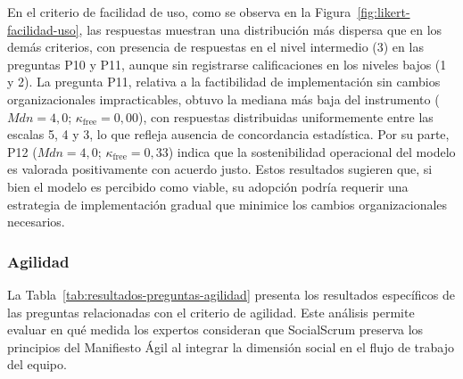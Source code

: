 \endgroup

En el criterio de facilidad de uso, como se observa en la Figura~\ref{fig:likert-facilidad-uso}, las respuestas muestran una distribución más dispersa que en los demás criterios, con presencia de respuestas en el nivel intermedio (3) en las preguntas P10 y P11, aunque sin registrarse calificaciones en los niveles bajos (1 y 2). La pregunta P11, relativa a la factibilidad de implementación sin cambios organizacionales impracticables, obtuvo la mediana más baja del instrumento ($Mdn = 4{,}0$; $\kappa_{\text{free}} = 0{,}00$), con respuestas distribuidas uniformemente entre las escalas 5, 4 y 3, lo que refleja ausencia de concordancia estadística. Por su parte, P12 ($Mdn = 4{,}0$; $\kappa_{\text{free}} = 0{,}33$) indica que la sostenibilidad operacional del modelo es valorada positivamente con acuerdo justo. Estos resultados sugieren que, si bien el modelo es percibido como viable, su adopción podría requerir una estrategia de implementación gradual que minimice los cambios organizacionales necesarios.



\subsubsection{Agilidad}

La Tabla~\ref{tab:resultados-preguntas-agilidad} presenta los resultados específicos de las preguntas relacionadas con el criterio de agilidad. Este análisis permite evaluar en qué medida los expertos consideran que SocialScrum preserva los principios del Manifiesto Ágil al integrar la dimensión social en el flujo de trabajo del equipo.

\begingroup
\scriptsize
\renewcommand{\arraystretch}{1.4}
\setlength{\tabcolsep}{4pt}
\setlength{\LTleft}{0pt}
\setlength{\LTright}{0pt}

